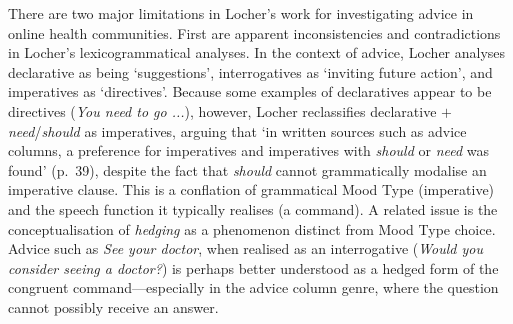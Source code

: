 
There are two major limitations in Locher's work for investigating advice in online health communities. First are apparent inconsistencies and contradictions in Locher's lexicogrammatical analyses. In the context of advice, Locher analyses declarative as being `suggestions', interrogatives as `inviting future action', and imperatives as `directives'. Because some examples of declaratives appear to be directives (\emph{You need to go ...}), however, Locher reclassifies declarative $+$ \emph{need}\slash \emph{should} as imperatives, arguing that `in written sources such as advice columns, a preference for imperatives and imperatives with \emph{should} or \emph{need} was found' (p.~39), despite the fact that \emph{should} cannot grammatically modalise an imperative clause. This is a conflation of grammatical Mood Type (imperative) and the speech function it typically realises (a command). A related issue is the conceptualisation of \emph{hedging} as a phenomenon distinct from Mood Type choice. Advice such as \emph{See your doctor}, when realised as an interrogative (\emph{Would you consider seeing a doctor?}) is perhaps better understood as a hedged form of the congruent command---especially in the advice column genre, where the question cannot possibly receive an answer.


